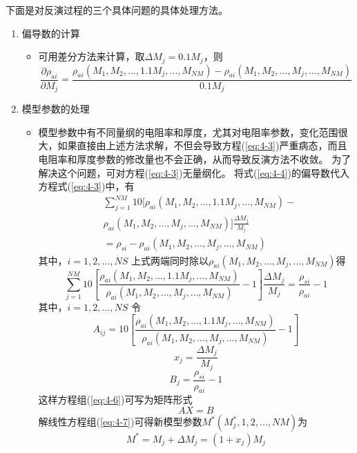 \documentclass[hyperref,UTF-8,twoside]{ctexart}
\numberwithin{equation}{section}
\begin{document}
下面是对反演过程的三个具体问题的具体处理方法。
\begin{enumerate}
\item 偏导数的计算
\begin{itemize}
\item 可用差分方法来计算，取$\Delta M_j=0.1M_j$，则
\begin{equation}
\frac{\partial \rho_{ai}}{\partial M_j}=\frac{\rho_{ai}(M_1,M_2,\ldots,1.1M_j,\ldots,M_{NM})-\rho_{ai}(M_1,M_2,\ldots,M_j,\ldots,M_{NM})}{0.1M_j}\label{eq:4-4}
\end{equation}
\end{itemize}
\item 模型参数的处理
\begin{itemize}
\item 模型参数中有不同量纲的电阻率和厚度，尤其对电阻率参数，变化范围很大，如果直接由上述方法求解，不但会导致方程(\ref{eq:4-3})严重病态，而且电阻率和厚度参数的修改量也不会正确，从而导致反演方法不收敛。
为了解决这个问题，可对方程(\ref{eq:4-3})无量纲化。
将式(\ref{eq:4-4})的偏导数代入方程式(\ref{eq:4-3})中，有
\begin{equation}   \begin{split}
&\sum_{j=1}^{NM}10[\rho_{ai}(M_1,M_2,\ldots,1.1M_j,\ldots,M_{NM})-\\
&\rho_{ai}(M_1,M_2,\ldots,M_j,\ldots,M_{NM})]\frac{\Delta M_j}{M_j}\\
&=\rho_{si}-\rho_{ai}(M_1,M_2,\ldots,M_j,\ldots,M_{NM})\label{eq:4-5}
\end{split}    \end{equation}
其中，$i=1,2,\ldots,NS$
上式两端同时除以$\rho_{ai}(M_1,M_2,\ldots,M_j,\ldots,M_{NM})$得
\begin{equation}
\sum_{j=1}^{NM}10[\frac{\rho_{ai}(M_1,M_2,\ldots,1.1M_j,\ldots,M_{NM})}{\rho_{ai}(M_1,M_2,\ldots,M_j,\ldots,M_{NM})}-1]\frac{\Delta M_j}{M_j}=\frac{\rho_{si}}{\rho_{ai}}-1\label{eq:4-6}
\end{equation}
其中，$i=1,2,\ldots,NS$
令
$$A_{ij}=10[\frac{\rho_{ai}(M_1,M_2,\ldots,1.1M_j,\ldots,M_{NM})}{\rho_{ai}(M_1,M_2,\ldots,M_j,\ldots,M_{NM})}-1]$$
$$x_j=\frac{\Delta M_j}{M_j}$$
$$B_j=\frac{\rho_{si}}{\rho_{ai}}-1$$
这样方程组(\ref{eq:4-6})可写为矩阵形式
\begin{equation}
AX=B\label{eq:4-7}
\end{equation}
解线性方程组(\ref{eq:4-7})可得新模型参数$M^*(M_{j}^*,1,2,\ldots,NM)$为
\begin{equation}
M^*=M_j+\Delta M_j=(1+x_j)M_j\label{eq:4-8}
\end{equation}

\end{itemize}
\end{enumerate}
\end{document}
